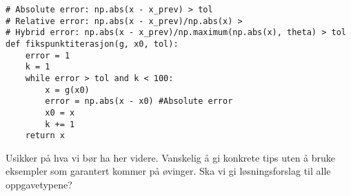 \documentclass[a4paper,12pt]{article}
\begin{document}
\begin{lstlisting}
# Absolute error: np.abs(x - x_prev) > tol
# Relative error: np.abs(x - x_prev)/np.abs(x) > 
# Hybrid error: np.abs(x - x_prev)/np.maximum(np.abs(x), theta) > tol
def fikspunktiterasjon(g, x0, tol):
    error = 1
    k = 1
    while error > tol and k < 100:
        x = g(x0)
        error = np.abs(x - x0) #Absolute error
        x0 = x
        k += 1
    return x
\end{lstlisting}


Usikker på hva vi bør ha her videre. Vanskelig å gi konkrete tips uten å bruke eksempler som garantert kommer på øvinger. Ska vi gi løsningsforslag til alle oppgavetypene?
\end{document}
